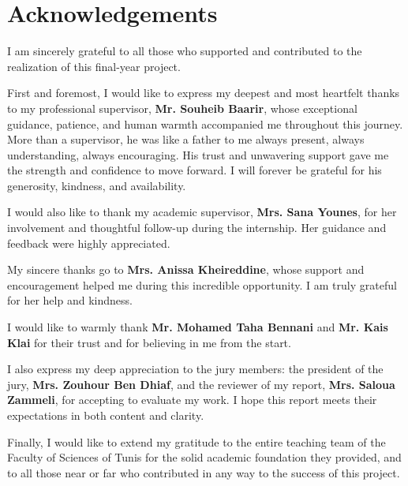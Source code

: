 \chapter*{\huge Acknowledgements}
\begin{center}
\noindent
I am sincerely grateful to all those who supported and contributed to the realization of this final-year project.

First and foremost, I would like to express my deepest and most heartfelt thanks to my professional supervisor, \textbf{Mr. Souheib Baarir}, whose exceptional guidance, patience, and human warmth accompanied me throughout this journey. More than a supervisor, he was like a father to me always present, always understanding, always encouraging. His trust and unwavering support gave me the strength and confidence to move forward. I will forever be grateful for his generosity, kindness, and availability.

I would also like to thank my academic supervisor, \textbf{Mrs. Sana Younes}, for her involvement and thoughtful follow-up during the internship. Her guidance and feedback were highly appreciated.

My sincere thanks go to \textbf{Mrs. Anissa Kheireddine}, whose support and encouragement helped me during this incredible opportunity. I am truly grateful for her help and kindness.

I would like to warmly thank \textbf{Mr. Mohamed Taha Bennani} and \textbf{Mr. Kais Klai} for their trust and for believing in me from the start.

I also express my deep appreciation to the jury members: the president of the jury, \textbf{Mrs. Zouhour Ben Dhiaf}, and the reviewer of my report, \textbf{Mrs. Saloua Zammeli}, for accepting to evaluate my work. I hope this report meets their expectations in both content and clarity.

Finally, I would like to extend my gratitude to the entire teaching team of the Faculty of Sciences of Tunis for the solid academic foundation they provided, and to all those  near or far  who contributed in any way to the success of this project.

\end{center}
